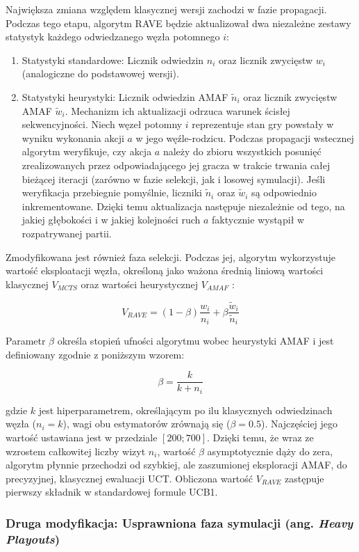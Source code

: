 \documentclass{article}
\begin{document}
Największa zmiana względem klasycznej wersji zachodzi w fazie propagacji. Podczas tego etapu, algorytm RAVE będzie aktualizował dwa niezależne zestawy statystyk każdego odwiedzanego węzła potomnego $i$:
\begin{enumerate}
    \item Statystyki standardowe: Licznik odwiedzin $n_i$ oraz licznik zwycięstw $w_i$ (analogiczne do podstawowej wersji).
    \item Statystyki heurystyki: Licznik odwiedzin AMAF $\tilde{n}_i$ oraz licznik zwycięstw AMAF $\tilde{w}_i$. Mechanizm ich aktualizacji odrzuca warunek ścisłej sekwencyjności. Niech węzeł potomny $i$ reprezentuje stan gry powstały w wyniku wykonania akcji $a$ w jego węźle-rodzicu. Podczas propagacji wstecznej algorytm weryfikuje, czy akcja $a$ należy do zbioru wszystkich posunięć zrealizowanych przez odpowiadającego jej gracza w trakcie trwania całej bieżącej iteracji (zarówno w fazie selekcji, jak i losowej symulacji). Jeśli weryfikacja przebiegnie pomyślnie, liczniki $\tilde{n}_i$ oraz $\tilde{w}_i$ są odpowiednio inkrementowane. Dzięki temu aktualizacja następuje niezależnie od tego, na jakiej głębokości i w jakiej kolejności ruch $a$ faktycznie wystąpił w rozpatrywanej partii.
\end{enumerate}

Zmodyfikowana jest również faza selekcji. Podczas jej, algorytm wykorzystuje wartość eksploatacji węzła, określoną jako ważona średnią liniową wartości klasycznej $V_{MCTS}$ oraz wartości heurystycznej $V_{AMAF}$ \cite{gelly2007monte}:

$$V_{RAVE} = (1 - \beta) \frac{w_i}{n_i} + \beta \frac{\tilde{w}_i}{\tilde{n}_i}$$

\noindent
Parametr $\beta$ określa stopień ufności algorytmu wobec heurystyki AMAF i jest definiowany zgodnie z poniższym wzorem:

$$\beta = \frac{k}{k + n_i}$$

\noindent
gdzie $k$ jest hiperparametrem, określającym po ilu klasycznych odwiedzinach węzła ($n_i = k$), wagi obu estymatorów zrównają się ($\beta = 0.5$). Najczęściej jego wartość ustawiana jest w przedziale $[200;700]$. Dzięki temu, że wraz ze wzrostem całkowitej liczby wizyt $n_i$, wartość $\beta$ asymptotycznie dąży do zera, algorytm płynnie przechodzi od szybkiej, ale zaszumionej eksploracji AMAF, do precyzyjnej, klasycznej ewaluacji UCT. Obliczona wartość $V_{RAVE}$ zastępuje pierwszy składnik w standardowej formule UCB1.

\subsubsection{Druga modyfikacja: Usprawniona faza symulacji (ang. \textit{Heavy Playouts})}
\end{document}
